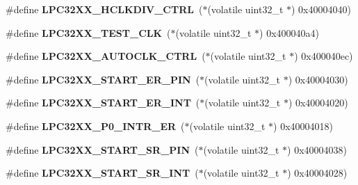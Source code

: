 \begin{DoxyCompactItemize}
\mbox{\label{group__lpc32xx__reg_gaeb29d1083ed477b06e0b86b8424f23d8}} 
\#define {\bfseries L\+P\+C32\+X\+X\+\_\+\+H\+C\+L\+K\+D\+I\+V\+\_\+\+C\+T\+RL}~($\ast$(volatile uint32\+\_\+t $\ast$) 0x40004040)
\item 
\mbox{\label{group__lpc32xx__reg_ga7c10a548d8ea5ceb5f8c35f3363472e3}} 
\#define {\bfseries L\+P\+C32\+X\+X\+\_\+\+T\+E\+S\+T\+\_\+\+C\+LK}~($\ast$(volatile uint32\+\_\+t $\ast$) 0x400040a4)
\item 
\mbox{\label{group__lpc32xx__reg_ga85562860ce081380ed0a243f3e711d15}} 
\#define {\bfseries L\+P\+C32\+X\+X\+\_\+\+A\+U\+T\+O\+C\+L\+K\+\_\+\+C\+T\+RL}~($\ast$(volatile uint32\+\_\+t $\ast$) 0x400040ec)
\item 
\mbox{\label{group__lpc32xx__reg_gad592295bb24bc563f29205d54a87d08c}} 
\#define {\bfseries L\+P\+C32\+X\+X\+\_\+\+S\+T\+A\+R\+T\+\_\+\+E\+R\+\_\+\+P\+IN}~($\ast$(volatile uint32\+\_\+t $\ast$) 0x40004030)
\item 
\mbox{\label{group__lpc32xx__reg_gaaa968ef272890ff7a3e9be813bda94b2}} 
\#define {\bfseries L\+P\+C32\+X\+X\+\_\+\+S\+T\+A\+R\+T\+\_\+\+E\+R\+\_\+\+I\+NT}~($\ast$(volatile uint32\+\_\+t $\ast$) 0x40004020)
\item 
\mbox{\label{group__lpc32xx__reg_gad91b8479145dc4853d722f70fded76a7}} 
\#define {\bfseries L\+P\+C32\+X\+X\+\_\+\+P0\+\_\+\+I\+N\+T\+R\+\_\+\+ER}~($\ast$(volatile uint32\+\_\+t $\ast$) 0x40004018)
\item 
\mbox{\label{group__lpc32xx__reg_gab831d70c4c9f8420ca9af356a562c87e}} 
\#define {\bfseries L\+P\+C32\+X\+X\+\_\+\+S\+T\+A\+R\+T\+\_\+\+S\+R\+\_\+\+P\+IN}~($\ast$(volatile uint32\+\_\+t $\ast$) 0x40004038)
\item 
\mbox{\label{group__lpc32xx__reg_gada346b336d53c958a27f41d09c1e3b83}} 
\#define {\bfseries L\+P\+C32\+X\+X\+\_\+\+S\+T\+A\+R\+T\+\_\+\+S\+R\+\_\+\+I\+NT}~($\ast$(volatile uint32\+\_\+t $\ast$) 0x40004028)
\item 
\mbox{\label{group__lpc32xx__reg_gabed112e64ee902b721904684ebcbed76}} 

\end{DoxyCompactItemize}
